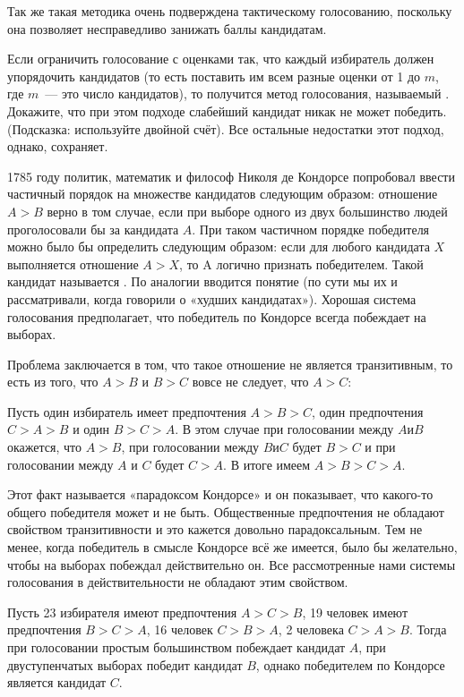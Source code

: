 Так же такая методика очень подверждена тактическому голосованию, поскольку она позволяет несправедливо занижать баллы кандидатам.

\begin{exercise}
Если ограничить голосование с оценками так, что каждый избиратель должен упорядочить кандидатов (то есть поставить им всем разные оценки от 1 до $m$, где $m$~— это число кандидатов), то получится метод голосования, называемый . Докажите, что при этом подходе слабейший кандидат никак не может победить. (Подсказка: используйте двойной счёт). Все остальные недостатки этот подход, однако, сохраняет.
\end{exercise}

1785 году политик, математик и философ Николя де Кондорсе попробовал ввести частичный порядок на множестве кандидатов следующим образом: отношение $A>B$ верно в том случае, если при выборе одного из двух большинство людей проголосовали бы за кандидата $A$. При таком частичном порядке победителя можно было бы определить следующим образом: если для любого кандидата $X$ выполняется отношение $A>X$, то A логично признать победителем. Такой кандидат называется . По аналогии вводится понятие  (по сути мы их и рассматривали, когда говорили о «худших кандидатах»). Хорошая система голосования предполагает, что победитель по Кондорсе всегда побеждает на выборах.

Проблема заключается в том, что такое отношение не является транзитивным, то есть из того, что $A>B$ и $B>C$ вовсе не следует, что $A>C$:

\begin{example}
Пусть один избиратель имеет предпочтения $A>B>C$, один предпочтения $C>A>B$ и один $B>C>A$. В этом случае при голосовании между $A и B$ окажется, что $A>B$, при голосовании между $B и C$ будет $B>C$ и при голосовании между $A$ и $C$ будет $C>A$. В итоге имеем $A>B>C>A$.
\end{example}

Этот факт называется «парадоксом Кондорсе» и он показывает, что какого-то общего победителя может и не быть. Общественные предпочтения не обладают свойством транзитивности и это кажется довольно парадоксальным. Тем не менее, когда победитель в смысле Кондорсе всё же имеется, было бы желательно, чтобы на выборах побеждал действительно он. Все рассмотренные нами системы голосования в действительности не обладают этим свойством.

\begin{example}
Пусть 23 избирателя имеют предпочтения $A>C>B$, 19 человек имеют предпочтения $B>C>A$, 16 человек $C>B>A$, 2 человека $C>A>B$. Тогда при голосовании простым большинством побеждает кандидат $A$, при двуступенчатых выборах победит кандидат $B$, однако победителем по Кондорсе является кандидат $C$.
\end{example}

